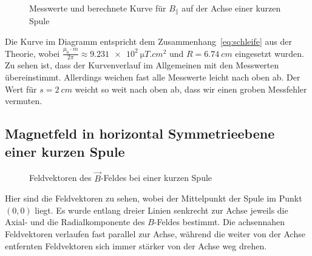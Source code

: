 \begin{figure}[H]
\centering
{}
\caption{Messwerte und berechnete Kurve für $B_\parallel$ auf der Achse einer kurzen Spule}
\label{fig:axialaufachsekurz}
\end{figure}

Die Kurve im Diagramm entspricht dem Zusammenhang~\cref{eq:schleife} aus der Theorie, wobei $\frac{\mu_0\cdot m}{2\pi}\approx \SI{9.231e2}{\micro T.cm^2}$ und $R=\SI{6.74}{cm}$ eingesetzt wurden.
Zu sehen ist, dass der Kurvenverlauf im Allgemeinen mit den Messwerten übereinstimmt. Allerdings weichen fast alle Messwerte leicht nach oben ab. Der Wert für $s=\SI{2}{cm}$ weicht so weit nach oben ab, dass wir einen groben Messfehler vermuten.

\subsection{Magnetfeld in horizontal Symmetrieebene einer kurzen Spule}
\begin{figure}[H]
  \centering

\caption{Feldvektoren des $\vec{B}$-Feldes bei einer kurzen Spule}
\end{figure}
Hier sind die Feldvektoren zu sehen, wobei der Mittelpunkt der Spule im Punkt $(0,0)$ liegt. Es wurde entlang dreier Linien senkrecht zur Achse jeweils die Axial- und die Radialkomponente des $B$-Feldes bestimmt. Die achsennahen Feldvektoren verlaufen fast parallel zur Achse, während die weiter von der Achse entfernten Feldvektoren sich immer stärker von der Achse weg drehen.

